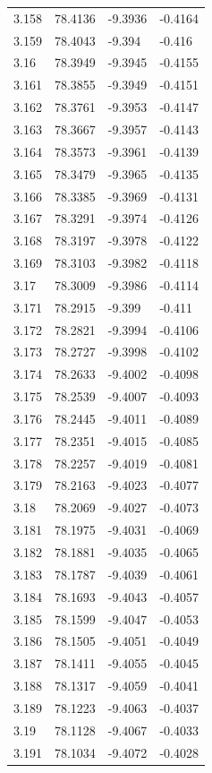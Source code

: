 \begin{tabular}{llll}
3.158 & 78.4136 & -9.3936 & -0.4164 \\
3.159 & 78.4043 & -9.394 & -0.416 \\
3.16 & 78.3949 & -9.3945 & -0.4155 \\
3.161 & 78.3855 & -9.3949 & -0.4151 \\
3.162 & 78.3761 & -9.3953 & -0.4147 \\
3.163 & 78.3667 & -9.3957 & -0.4143 \\
3.164 & 78.3573 & -9.3961 & -0.4139 \\
3.165 & 78.3479 & -9.3965 & -0.4135 \\
3.166 & 78.3385 & -9.3969 & -0.4131 \\
3.167 & 78.3291 & -9.3974 & -0.4126 \\
3.168 & 78.3197 & -9.3978 & -0.4122 \\
3.169 & 78.3103 & -9.3982 & -0.4118 \\
3.17 & 78.3009 & -9.3986 & -0.4114 \\
3.171 & 78.2915 & -9.399 & -0.411 \\
3.172 & 78.2821 & -9.3994 & -0.4106 \\
3.173 & 78.2727 & -9.3998 & -0.4102 \\
3.174 & 78.2633 & -9.4002 & -0.4098 \\
3.175 & 78.2539 & -9.4007 & -0.4093 \\
3.176 & 78.2445 & -9.4011 & -0.4089 \\
3.177 & 78.2351 & -9.4015 & -0.4085 \\
3.178 & 78.2257 & -9.4019 & -0.4081 \\
3.179 & 78.2163 & -9.4023 & -0.4077 \\
3.18 & 78.2069 & -9.4027 & -0.4073 \\
3.181 & 78.1975 & -9.4031 & -0.4069 \\
3.182 & 78.1881 & -9.4035 & -0.4065 \\
3.183 & 78.1787 & -9.4039 & -0.4061 \\
3.184 & 78.1693 & -9.4043 & -0.4057 \\
3.185 & 78.1599 & -9.4047 & -0.4053 \\
3.186 & 78.1505 & -9.4051 & -0.4049 \\
3.187 & 78.1411 & -9.4055 & -0.4045 \\
3.188 & 78.1317 & -9.4059 & -0.4041 \\
3.189 & 78.1223 & -9.4063 & -0.4037 \\
3.19 & 78.1128 & -9.4067 & -0.4033 \\
3.191 & 78.1034 & -9.4072 & -0.4028 \\

\end{tabular}
